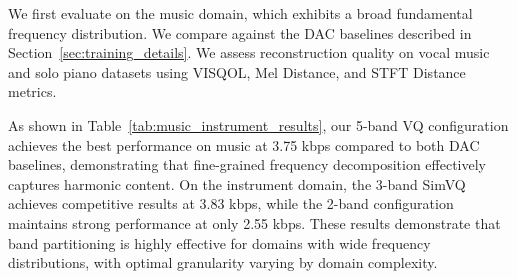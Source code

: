 \documentclass[11pt]{article}
\begin{document}
We first evaluate on the music domain, which exhibits a broad fundamental frequency distribution. We compare against the DAC baselines described in Section~\ref{sec:training_details}. We assess reconstruction quality on vocal music and solo piano datasets using VISQOL, Mel Distance, and STFT Distance metrics.

As shown in Table~\ref{tab:music_instrument_results}, our 5-band VQ configuration achieves the best performance on music at 3.75 kbps compared to both DAC baselines, demonstrating that fine-grained frequency decomposition effectively captures harmonic content. On the instrument domain, the 3-band SimVQ achieves competitive results at 3.83 kbps, while the 2-band configuration maintains strong performance at only 2.55 kbps. These results demonstrate that band partitioning is highly effective for domains with wide frequency distributions, with optimal granularity varying by domain complexity.
\end{document}
